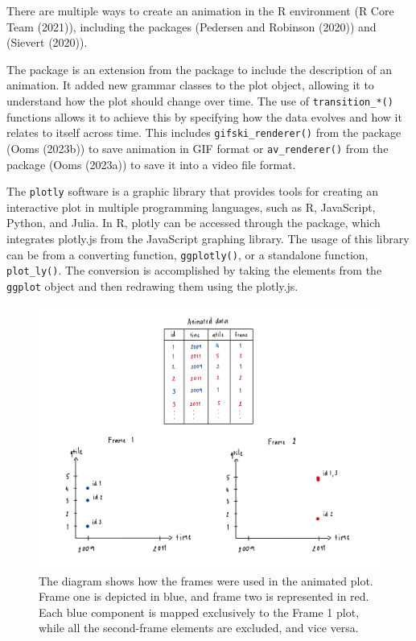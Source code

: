 There are multiple ways to create an animation in the R environment (R Core Team (2021)), including the packages  (Pedersen and Robinson (2020)) and  (Sievert (2020)).

The  package is an extension from the  package to include the description of an animation. It added new grammar classes to the plot object, allowing it to understand how the plot should change over time. The use of \texttt{transition\_*()} functions allows it to achieve this by specifying how the data evolves and how it relates to itself across time. This includes \texttt{gifski\_renderer()} from the  package (Ooms (2023b)) to save animation in GIF format or \texttt{av\_renderer()} from the  package (Ooms (2023a)) to save it into a video file format.

The \texttt{plotly} software is a graphic library that provides tools for creating an interactive plot in multiple programming languages, such as R, JavaScript, Python, and Julia. In R, plotly can be accessed through the  package, which integrates plotly.js from the JavaScript graphing library. The usage of this library can be from a converting function, \texttt{ggplotly()}, or a standalone function, \texttt{plot\_ly()}. The conversion is accomplished by taking the elements from the \texttt{ggplot} object and then redrawing them using the plotly.js.

\begin{figure}

{\centering \includegraphics[width=1\linewidth]{figures/animated-diagram} 

}

\caption{The diagram shows how the frames were used in the animated plot. Frame one is depicted in blue, and frame two is represented in red. Each blue component is mapped exclusively to the Frame 1 plot, while all the second-frame elements are excluded, and vice versa.}\label{fig:animated-diagram}
\end{figure}

